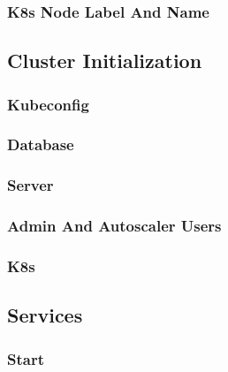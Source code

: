 \subsubsection{K8s Node Label And Name}
\label{subsubsec:implementation_installer_node_registration_k8s_node_label_and_name}

\subsection{Cluster Initialization}
\label{subsec:implementation_installer_cluster_initialization}

\subsubsection{Kubeconfig}
\label{subsubsec:implementation_installer_cluster_initialization_kubeconfig}

\subsubsection{Database}
\label{subsubsec:implementation_installer_cluster_initialization_database}

\subsubsection{Server}
\label{subsubsec:implementation_installer_cluster_initialization_server}

\subsubsection{Admin And Autoscaler Users}
\label{subsubsec:implementation_installer_cluster_initialization_admin_and_autoscaler_users}

\subsubsection{K8s}
\label{subsubsec:implementation_installer_cluster_initialization_k8s}

\subsection{Services}
\label{subsec:implementation_installer_services}

\subsubsection{Start}
\label{subsubsec:implementation_installer_services_start}

